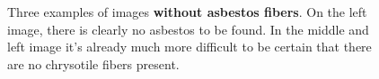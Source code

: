 \begin{figure}[h]
\centering
\caption{Three examples of images \textbf{without asbestos fibers}. On the left image, there is clearly no asbestos to be found. In the middle and left image it's already much more difficult to be certain that there are no chrysotile fibers present.}
\label{fig:non-asbestos_examples}
\end{figure}

\quad

